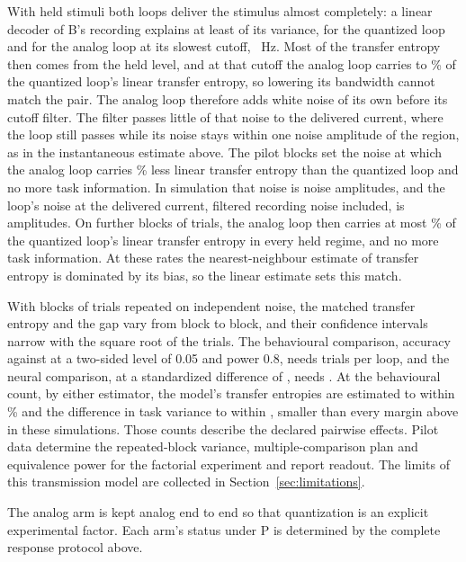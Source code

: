 \documentclass[12pt]{article}
\begin{document}
With held stimuli both loops deliver the stimulus almost completely: a linear
decoder of B's recording explains at least \uBrHeldDecodMin{} of its variance,
for the quantized loop and for the analog loop at its slowest cutoff,
\ueBridgeMinCutoffHz{}~Hz. Most of the transfer entropy then comes from the
held level, and at that cutoff the analog loop carries \uBrHeldFloorTeMinPercent{}
to \uBrHeldFloorTeMaxPercent\% of the quantized loop's linear transfer entropy,
so lowering its bandwidth cannot match the pair. The analog loop therefore adds
white noise of its own before its cutoff filter. The filter passes little of
that noise to the delivered current, where the loop still passes while its
noise stays within one noise amplitude of the region, as in the instantaneous
estimate above. The pilot blocks set the noise at which the analog loop carries
\uBrNoiseMarginPercent\% less linear transfer entropy than the quantized loop
and no more task information. In simulation that noise is \uBrHeldNoise{} noise
amplitudes, and the loop's noise at the delivered current, filtered recording
noise included, is \uBrHeldChannelNoise{} amplitudes. On \uBrNoiseBlocks{} further blocks
of \uBrBlockTrials{} trials, the analog loop then carries at most
\uBrHeldNoiseTeMaxPercent\% of the quantized loop's linear transfer entropy in
every held regime, and no more task information. At these rates the
nearest-neighbour estimate of transfer entropy is dominated by its bias, so the
linear estimate sets this match.

With blocks of \uBrBlockTrials{} trials repeated on independent noise, the matched transfer
entropy and the gap vary from block to block, and their confidence intervals
narrow with the square root of the trials. The behavioural comparison, accuracy
\uBrAccHigh{} against \uBrAccLow{} at a two-sided level of 0.05 and power 0.8,
needs \uBrTrialsBehaviour{} trials per loop, and the neural comparison, at a
standardized difference of \uBrNeuralEffect{}, needs \uBrTrialsNeural{}. At the
behavioural count, by either estimator, the model's transfer entropies are
estimated to within \uBrTeTolPercent\% and the difference in task variance to within
\uBrGapTol{}, smaller than every margin above in these simulations. Those counts describe
the declared pairwise effects. Pilot data determine the repeated-block
variance, multiple-comparison plan and equivalence power for the factorial
experiment and report readout. The limits of this transmission model are
collected in Section~\ref{sec:limitations}.

The analog arm is kept analog end to end so that quantization is an explicit
experimental factor. Each arm's status under P is determined by the complete
response protocol above.
\end{document}

